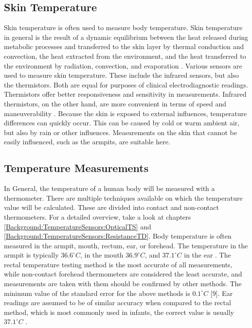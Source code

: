 \subsection{Skin Temperature}
\label{Background:BodyTemperature:SkinTemperature}
Skin temperature is often used to measure body temperature.
Skin temperature in general is the result of a dynamic equilibrium between the heat released during metabolic processes and transferred to the skin layer by thermal conduction and convection, the heat extracted from the environment, and the heat transferred to the environment by radiation, convection, and evaporation \cite{dolibogComparativeAnalysisHuman2022}.
Various sensors are used to measure skin temperature. 
These include the infrared sensors, but also the thermistors. 
Both are equal for purposes of clinical electrodiagnostic readings.
Thermistors offer better responsiveness and sensitivity in measurements.
Infrared thermistors, on the other hand, are more convenient in terms of speed and maneuverability \cite{burnhamThreeTypesSkinSurface2006}.
Because the skin is exposed to external influences, temperature differences can quickly occur.
This can be caused by cold or warm ambient air, but also by rain or other influences.
Measurements on the skin that cannot be easily influenced, such as the armpits, are suitable here.

\subsection{Temperature Measurements}
\label{Background:BodyTemperature:TemperatureMeasurements}
In General, the temperature of a human body will be measured with a thermometer.
There are multiple techniques available on which the temperature value will be calculated. 
These are divided into contact and non-contact thermometers.
For a detailed overview, take a look at chapters \ref{Background:TemperatureSensors:OpticalTS} and \ref{Background:TemperatureSensors:ResistanceTD}.
Body temperature is often measured in the armpit, mouth, rectum, ear, or forehead.
The temperature in the armpit is typically $36.6^\circ C$, in the mouth $36.9^\circ C$, and $37.1^\circ C$ in the ear \cite{dolibogComparativeAnalysisHuman2022}.
The rectal temperature testing method is the most accurate of all measurements, while non-contact forehead thermometers are considered the least accurate, and measurements are taken with them should be confirmed by other methods.
The minimum value of the standard error for the above methods is $0.1^\circ C$ [9].
Ear readings are assumed to be of similar accuracy when compared to the rectal method, which is most commonly used in infants, the correct value is usually $37.1^\circ C$ \cite{dolibogComparativeAnalysisHuman2022}.

